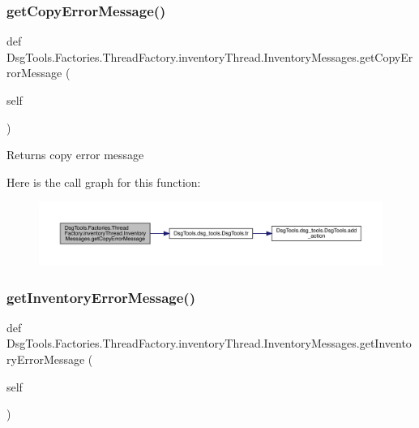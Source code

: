\subsubsection{\texorpdfstring{get\+Copy\+Error\+Message()}{getCopyErrorMessage()}}
{\footnotesize\ttfamily def Dsg\+Tools.\+Factories.\+Thread\+Factory.\+inventory\+Thread.\+Inventory\+Messages.\+get\+Copy\+Error\+Message (\begin{DoxyParamCaption}\item[{}]{self }\end{DoxyParamCaption})}

\begin{DoxyVerb}Returns copy error message
\end{DoxyVerb}
 Here is the call graph for this function\+:
\nopagebreak
\begin{figure}[H]
\begin{center}
\leavevmode
\includegraphics[width=350pt]{class_dsg_tools_1_1_factories_1_1_thread_factory_1_1inventory_thread_1_1_inventory_messages_af500d330a3c297db02124e1044a53854_cgraph}
\end{center}
\end{figure}
\mbox{\label{class_dsg_tools_1_1_factories_1_1_thread_factory_1_1inventory_thread_1_1_inventory_messages_acaa56999d5c8614492da09a23710841d}} 
\subsubsection{\texorpdfstring{get\+Inventory\+Error\+Message()}{getInventoryErrorMessage()}}
{\footnotesize\ttfamily def Dsg\+Tools.\+Factories.\+Thread\+Factory.\+inventory\+Thread.\+Inventory\+Messages.\+get\+Inventory\+Error\+Message (\begin{DoxyParamCaption}\item[{}]{self }\end{DoxyParamCaption})}

